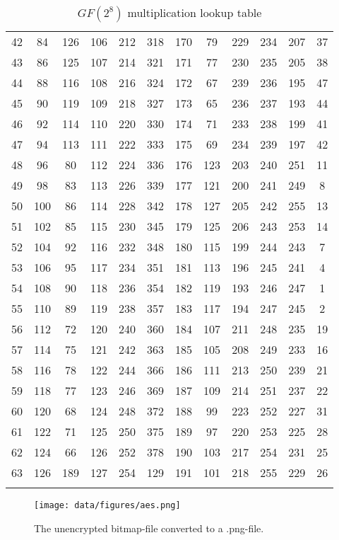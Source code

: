 \begin{longtable}{ccc|ccc|ccc|ccc}
  42 & 84  & 126 & 106 & 212 & 318 & 170 & 79  & 229 & 234 & 207 & 37  \\
  43 & 86  & 125 & 107 & 214 & 321 & 171 & 77  & 230 & 235 & 205 & 38  \\
  44 & 88  & 116 & 108 & 216 & 324 & 172 & 67  & 239 & 236 & 195 & 47  \\
  45 & 90  & 119 & 109 & 218 & 327 & 173 & 65  & 236 & 237 & 193 & 44  \\
  46 & 92  & 114 & 110 & 220 & 330 & 174 & 71  & 233 & 238 & 199 & 41  \\
  47 & 94  & 113 & 111 & 222 & 333 & 175 & 69  & 234 & 239 & 197 & 42  \\
  48 & 96  & 80  & 112 & 224 & 336 & 176 & 123 & 203 & 240 & 251 & 11  \\
  49 & 98  & 83  & 113 & 226 & 339 & 177 & 121 & 200 & 241 & 249 & 8   \\
  50 & 100 & 86  & 114 & 228 & 342 & 178 & 127 & 205 & 242 & 255 & 13  \\
  51 & 102 & 85  & 115 & 230 & 345 & 179 & 125 & 206 & 243 & 253 & 14  \\
  52 & 104 & 92  & 116 & 232 & 348 & 180 & 115 & 199 & 244 & 243 & 7   \\
  53 & 106 & 95  & 117 & 234 & 351 & 181 & 113 & 196 & 245 & 241 & 4   \\
  54 & 108 & 90  & 118 & 236 & 354 & 182 & 119 & 193 & 246 & 247 & 1   \\
  55 & 110 & 89  & 119 & 238 & 357 & 183 & 117 & 194 & 247 & 245 & 2   \\
  56 & 112 & 72  & 120 & 240 & 360 & 184 & 107 & 211 & 248 & 235 & 19  \\
  57 & 114 & 75  & 121 & 242 & 363 & 185 & 105 & 208 & 249 & 233 & 16  \\
  58 & 116 & 78  & 122 & 244 & 366 & 186 & 111 & 213 & 250 & 239 & 21  \\
  59 & 118 & 77  & 123 & 246 & 369 & 187 & 109 & 214 & 251 & 237 & 22  \\
  60 & 120 & 68  & 124 & 248 & 372 & 188 & 99  & 223 & 252 & 227 & 31  \\
  61 & 122 & 71  & 125 & 250 & 375 & 189 & 97  & 220 & 253 & 225 & 28  \\
  62 & 124 & 66  & 126 & 252 & 378 & 190 & 103 & 217 & 254 & 231 & 25  \\
  63 & 126 & 189 & 127 & 254 & 129 & 191 & 101 & 218 & 255 & 229 & 26 \\
  \caption{$GF(2^8)$ multiplication lookup table}
  \label{gal_mult_lookup}
\end{longtable}
\begin{figure}[h]
\centering
\texttt{[image: data/figures/aes.png]}
\caption{The unencrypted bitmap-file converted to a .png-file.}
\label{fig:aespng}
\end{figure}

